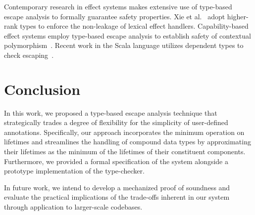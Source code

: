 \documentclass[11pt]{article}
\begin{document}
    Contemporary research in effect systems makes extensive use of type-based escape analysis to formally guarantee safety properties.
    Xie et al.~\cite{xie2022first} adopt higher-rank types to enforce the non-leakage of lexical effect handlers.
    Capability-based effect systems employ type-based escape analysis to establish safety of contextual polymorphism~\cite{osvald2016gentrification, brachthauser2020effects, brachthauser2022effects}.
    Recent work in the Scala language utilizes dependent types to check escaping~\cite{boruch2023capturing}.


    \section{Conclusion}

    In this work, we proposed a type-based escape analysis technique that strategically trades a degree of flexibility for the simplicity of user-defined annotations.
    Specifically, our approach incorporates the minimum operation on lifetimes and streamlines the handling of compound data types by approximating their lifetimes as the minimum of the lifetimes of their constituent components.
    Furthermore, we provided a formal specification of the system alongside a prototype implementation of the type-checker.

    In future work, we intend to develop a mechanized proof of soundness and evaluate the practical implications of the trade-offs inherent in our system through application to larger-scale codebases.


    
    
\end{document}
